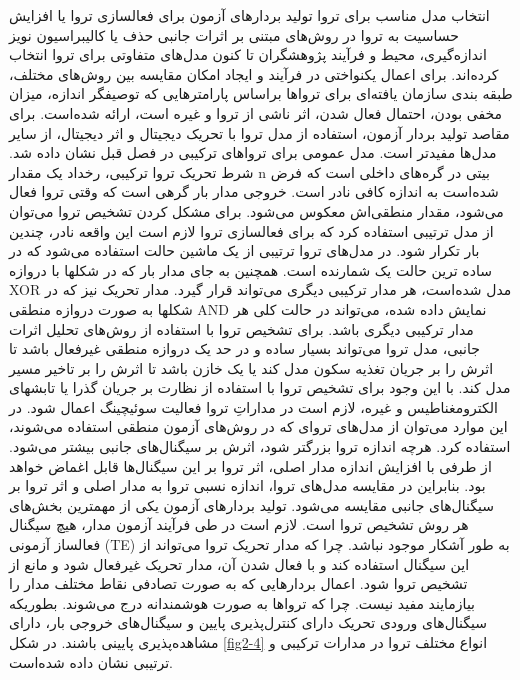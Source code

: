  انتخاب مدل مناسب برای تروا
 تولید بردارهای آزمون برای فعالسازی تروا یا افزایش حساسیت به تروا در روش‌های مبتنی بر اثرات جانبی
 حذف یا کالیبراسیون نویز اندازه‌گیری، محیط و فرآیند
پژوهشگران تا کنون مدل‌های متفاوتی برای تروا انتخاب کرده‌اند. برای اعمال یکنواختی در فرآیند و ایجاد امکان مقایسه بین روش‌های مختلف، طبقه بندی سازمان یافته‌ای برای تروا‌ها براساس پارامترهایی که توصیفگر اندازه، میزان مخفی بودن، احتمال فعال شدن، اثر ناشی از تروا و غیره است، ارائه شده‌است. برای مقاصد تولید بردار آزمون، استفاده از مدل تروا با تحریک دیجیتال و اثر دیجیتال، از سایر مدل‌ها مفیدتر است.  
 مدل عمومی برای تروا‌های ترکیبی در فصل قبل نشان داده شد. شرط تحریک تروا ترکیبی، رخداد یک مقدار n بیتی در گره‌های داخلی است که فرض شده‌است به اندازه کافی نادر است. خروجی مدار بار گرهی است که وقتی تروا فعال می‌شود، مقدار منطقی‌اش معکوس می‌شود. برای مشکل کردن تشخیص تروا می‌توان از مدل ترتیبی استفاده کرد که برای فعالسازی تروا لازم است این واقعه نادر، چندین بار تکرار شود. در مدل‌های تروا ترتیبی از یک ماشین حالت استفاده می‌شود که در ساده ترین حالت یک شمارنده است. همچنین به جای مدار بار که در شکلها با دروازه XOR مدل شده‌است، هر مدار ترکیبی دیگری می‌تواند قرار گیرد. مدار تحریک نیز که در شکلها به صورت دروازه منطقی AND نمایش داده شده، می‌تواند در حالت کلی هر مدار ترکیبی دیگری باشد.
برای تشخیص تروا با استفاده از روش‌های تحلیل اثرات جانبی، مدل تروا می‌تواند بسیار ساده و در حد یک دروازه منطقی غیرفعال باشد تا اثرش را بر جریان تغذیه سکون مدل کند یا یک خازن باشد تا اثرش را بر تاخیر مسیر مدل کند. با این وجود برای تشخیص تروا با استفاده از نظارت بر جریان گذرا یا تابشهای الکترومغناطیس و غیره، لازم است در مداراتِ تروا فعالیت سوئیچینگ اعمال شود. در این موارد می‌توان از مدل‌های تروای که در روش‌های آزمون منطقی استفاده می‌شوند، استفاده کرد. هرچه اندازه تروا بزرگتر شود، اثرش بر سیگنال‌های جانبی بیشتر می‌شود. از طرفی با افزایش اندازه مدار اصلی، اثر تروا بر این سیگنال‌ها قابل اغماض خواهد بود. بنابراین در مقایسه مدل‌های تروا، اندازه نسبی تروا به مدار اصلی و اثر تروا بر سیگنال‌های جانبی مقایسه می‌شود. 
تولید بردارهای آزمون یکی از مهمترین بخش‌های هر روش تشخیص تروا است. لازم است در طی فرآیند آزمون مدار، هیچ سیگنال فعالساز آزمونی (TE) به طور آشکار موجود نباشد. چرا که مدار تحریک تروا می‌تواند از این سیگنال استفاده کند و با فعال شدن آن، مدار تحریک غیرفعال شود و مانع از تشخیص تروا شود. اعمال بردارهایی که به صورت تصادفی نقاط مختلف مدار را بیازمایند مفید نیست. چرا که تروا‌ها به صورت هوشمندانه درج می‌شوند. بطوریکه سیگنال‌های ورودی تحریک دارای کنترل‌پذیری پایین و سیگنال‌های خروجی بار، دارای مشاهده‌پذیری پایینی باشند. در شکل \ref{fig2-4} انواع مختلف تروا در مدارات ترکیبی و ترتیبی نشان داده شده‌است.

